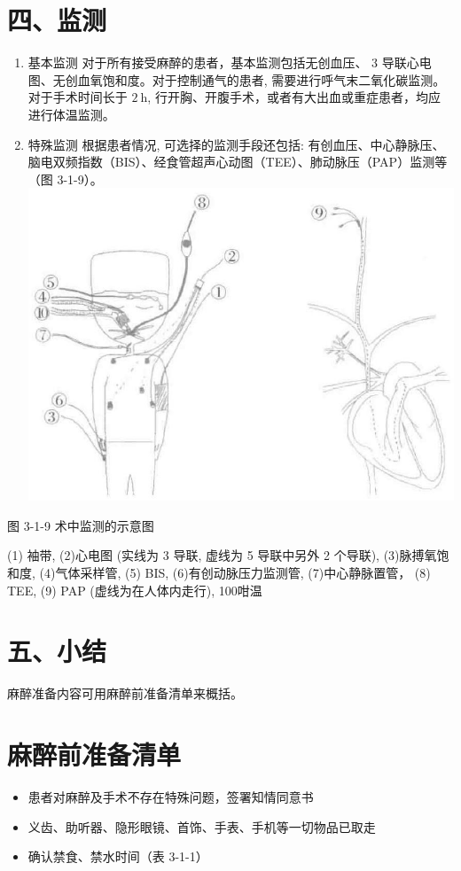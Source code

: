 \documentclass[10pt]{article}
\begin{document}
\section*{四、监测}
\begin{enumerate}
  \item 基本监测 对于所有接受麻醉的患者，基本监测包括无创血压、 3 导联心电图、无创血氧饱和度。对于控制通气的患者, 需要进行呼气末二氧化碳监测。对于手术时间长于 $2 \mathrm{~h}$, 行开胸、开腹手术，或者有大出血或重症患者，均应\\
进行体温监测。

  \item 特殊监测 根据患者情况, 可选择的监测手段还包括: 有创血压、中心静脉压、脑电双频指数（BIS）、经食管超声心动图（TEE）、肺动脉压（PAP）监测等（图 3-1-9）。\\
\includegraphics[max width=\textwidth, center]{2024_07_05_645bb794a4d4f32ee0c8g-077}

\end{enumerate}

图 3-1-9 术中监测的示意图

(1) 袖带, (2)心电图 (实线为 3 导联, 虚线为 5 导联中另外 2 个导联), (3)脉搏氧饱和度, (4)气体采样管, (5) BIS, (6)有创动脉压力监测管, (7)中心静脉置管， (8) TEE, (9) PAP (虚线为在人体内走行), 100咁温

\section*{五、小结}
麻醉准备内容可用麻醉前准备清单来概括。

\section*{麻醉前准备清单}
\begin{itemize}
  \item 患者对麻醉及手术不存在特殊问题，签署知情同意书
  \item 义齿、助听器、隐形眼镜、首饰、手表、手机等一切物品已取走
  \item 确认禁食、禁水时间（表 3-1-1）
\end{itemize}
\end{document}

